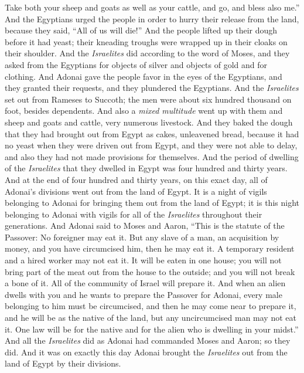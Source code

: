 \begin{biblechapter}
\verse Take both your sheep and goats as well as your cattle, and go, and bless also me.”
\verse And the Egyptians urged the people in order to hurry their release from the land, because they said, “All of us will die!”
\verse And the people lifted up their dough before it had yeast; their kneading troughs were wrapped up in their cloaks on their shoulder.
\verse And the \textit{Israelites} did according to the word of Moses, and they asked from the Egyptians for objects of silver and objects of gold and for clothing.
\verse And Adonai gave the people favor in the eyes of the Egyptians, and they granted their requests, and they plundered the Egyptians.
\verse And the \textit{Israelites} set out from Rameses to Succoth; the men were about six hundred thousand on foot, besides dependents.
\verse And also a \textit{mixed multitude} went up with them and sheep and goats and cattle, very numerous livestock.
\verse And they baked the dough that they had brought out from Egypt as cakes, unleavened bread, because it had no yeast when they were driven out from Egypt, and they were not able to delay, and also they had not made provisions for themselves.
\verse And the period of dwelling of the \textit{Israelites} that they dwelled in Egypt was four hundred and thirty years.
\verse And at the end of four hundred and thirty years, on this exact day, all of Adonai’s divisions went out from the land of Egypt.
\verse It is a night of vigils belonging to Adonai for bringing them out from the land of Egypt; it is this night belonging to Adonai with vigils for all of the \textit{Israelites} throughout their generations.
\verse And Adonai said to Moses and Aaron, “This is the statute of the Passover: No foreigner may eat it.
\verse But any slave of a man, an acquisition by money, and you have circumcised him, then he may eat it.
\verse A temporary resident and a hired worker may not eat it.
\verse It will be eaten in one house; you will not bring part of the meat out from the house to the outside; and you will not break a bone of it.
\verse All of the community of Israel will prepare it.
\verse And when an alien dwells with you and he wants to prepare the Passover for Adonai, every male belonging to him must be circumcised, and then he may come near to prepare it, and he will be as the native of the land, but any uncircumcised man may not eat it.
\verse One law will be for the native and for the alien who is dwelling in your midst.”
\verse And all the \textit{Israelites} did as Adonai had commanded Moses and Aaron; so they did.
\verse And it was on exactly this day Adonai brought the \textit{Israelites} out from the land of Egypt by their divisions.
\end{biblechapter}

